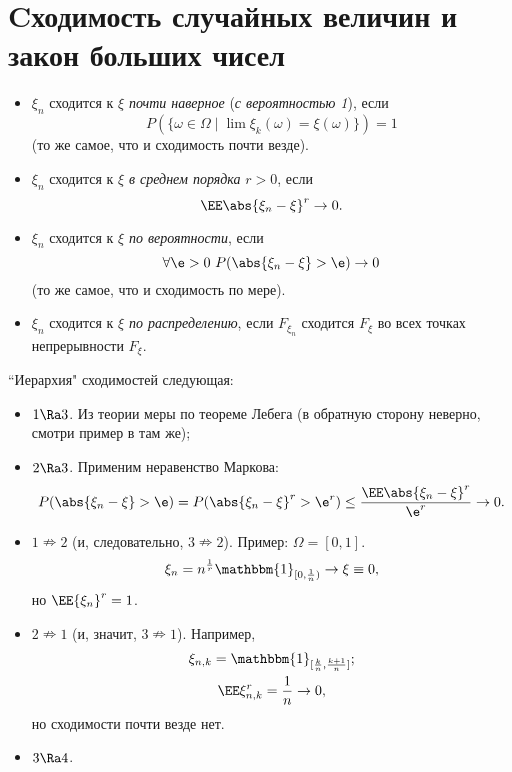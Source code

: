 \section{Cходимость случайных величин и закон больших чисел}

 \begin{definition}
\enewline
     \begin{itemize}
         \item $\xi_n$ сходится к $\xi$ \textit{почти наверное} (\textit{с вероятностью 1}), если
               $$P(\{\omega \in \Omega \mid \lim\xi_k(\omega) = \xi(\omega)\}) = 1$$ (то же самое, что и сходимость почти везде).

         \item $\xi_n$ сходится к $\xi$ \textit{в среднем порядка} $r > 0$, если 
         $$\EE \abs{\xi_n - \xi}^r\rightarrow 0.$$

         \item $\xi_n$ сходится к $\xi$ \textit{по вероятности}, если 
         $$\forall \e > 0 \ P(\abs{\xi_n - \xi} > \e)\rightarrow 0$$ 
         (то же самое, что и сходимость по мере).

         \item $\xi_n$ сходится к $\xi$ \textit{по распределению}, если $F_{\xi_n}$ сходится $F_\xi$ во всех точках непрерывности $F_\xi$.
     \end{itemize}
 \end{definition}

``Иерархия" сходимостей следующая:

\begin{itemize}
    \item  $1\Ra 3$. Из теории меры по теореме Лебега (в обратную сторону неверно, смотри пример в там же);
    \item $2\Ra 3$. Применим неравенство Маркова:
    $$P(\abs{\xi_n - \xi} >\e) = P(\abs{\xi_n - \xi}^r> \e^r)  \le  \frac{\EE \abs{\xi_n - \xi}^r}{\e^r} \rightarrow 0.$$
    \item  $1\nRightarrow 2$ (и, следовательно, $3\nRightarrow 2$).  Пример: $\Omega = [0, 1]$.
    $$\xi_n = n^\frac{1}{r}\mathbbm{1}_{[0, \frac{1}{n})} \rightarrow \xi \equiv 0,$$ но
 $\EE {\xi_n}^r = 1$.
 \item  $2\nRightarrow 1$ (и, значит, $3\nRightarrow 1$).
 Например,
 \begin{gather*}
     \xi_{n, k} = \mathbbm{1}_{[\frac{k}{n}, \frac{k + 1}{n}]};\\
     \EE \xi_{n, k}^r = \frac{1}{n}\rightarrow 0,
 \end{gather*}
 но сходимости почти везде нет.
    \item  $3\Ra 4$. 
\end{itemize}

